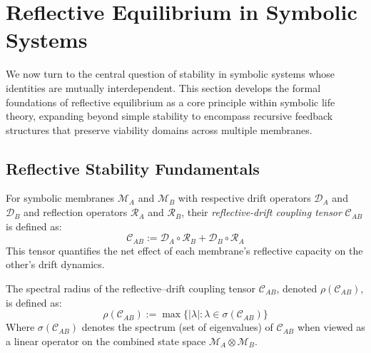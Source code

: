 \section{Reflective Equilibrium in Symbolic Systems}
\label{sec:bk5_reflective_equilibrium_in_symbolic_systems}
We now turn to the central question of stability in symbolic systems whose identities are mutually interdependent. This section develops the formal foundations of reflective equilibrium as a core principle within symbolic life theory, expanding beyond simple stability to encompass recursive feedback structures that preserve viability domains across multiple membranes.
\subsection{Reflective Stability Fundamentals}
\label{subsec:bk5_reflective_stability_fundamentals}
\begin{definition} \label{definition:bk5_reflective_drift_coupling_tensor}
For symbolic membranes $\mathscr{M}_A$ and $\mathscr{M}_B$ with respective drift operators $\mathscr{D}_A$ and $\mathscr{D}_B$ and reflection operators $\mathscr{R}_A$ and $\mathscr{R}_B$, their \emph{reflective-drift coupling tensor} $\mathcal{C}_{AB}$ is defined as:
\begin{equation}
\mathcal{C}_{AB} := \mathscr{D}_A \circ \mathscr{R}_B + \mathscr{D}_B \circ \mathscr{R}_A
\end{equation}
This tensor quantifies the net effect of each membrane's reflective capacity on the other's drift dynamics.
\end{definition}
\begin{definition} \label{definition:bk5_spectral_radius_of_coupl}
The spectral radius of the reflective–drift coupling tensor \( \mathcal{C}_{AB} \), denoted \( \rho(\mathcal{C}_{AB}) \), is defined as:
\begin{equation}
\rho(\mathcal{C}_{AB}) := \max\{|\lambda| : \lambda \in \sigma(\mathcal{C}_{AB})\}
\end{equation}
Where $\sigma(\mathcal{C}_{AB})$ denotes the spectrum (set of eigenvalues) of $\mathcal{C}_{AB}$ when viewed as a linear operator on the combined state space $\mathscr{M}_A \otimes \mathscr{M}_B$.
\end{definition}
